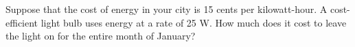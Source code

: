 Suppose that the cost of energy in your city is 15 cents
per kilowatt-hour.
A cost-efficient light bulb uses energy at a rate of 25 W. How
much does it cost to leave the light on for the entire month of
January?\answercheck
